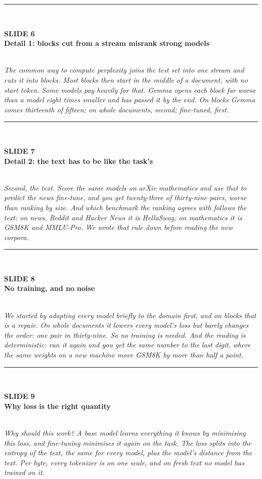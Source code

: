 \documentclass[11pt,a4paper]{article}
\newcommand{\slide}[3]{%
  \vspace{1.0em}%
  {\color{rule}\rule{\textwidth}{0.6pt}}\\[0.35em]%
  \begin{minipage}[t]{0.78\textwidth}%
    {\color{accent}\footnotesize\bfseries SLIDE #1}\\[0.15em]%
    {\large\bfseries #2}%
  \end{minipage}\hfill%
  \begin{minipage}[t]{0.20\textwidth}%
    \raggedleft{\footnotesize\color{mute}#3}%
  \end{minipage}\\[0.5em]%
}
\newenvironment{say}{\itshape}{\par}
\begin{document}
\slide{6}{Detail 1: blocks cut from a stream misrank strong models}{3:25--4:15}
\begin{say}
The common way to compute perplexity joins the test set into one stream and cuts it into blocks.
Most blocks then start in the middle of a document, with no start token. Some models pay heavily
for that. Gemma opens each block far worse than a model eight times smaller and has passed it by
the end. On blocks Gemma comes thirteenth of fifteen; on whole documents, second; fine-tuned,
first.
\end{say}

\slide{7}{Detail 2: the text has to be like the task's}{4:15--5:05}
\begin{say}
Second, the text. Score the same models on arXiv mathematics and use that to predict the news
fine-tune, and you get twenty-three of thirty-nine pairs, worse than ranking by size. And which
benchmark the ranking agrees with follows the text: on news, Reddit and Hacker News it is
HellaSwag; on mathematics it is GSM8K and MMLU-Pro. We wrote that rule down before reading the new
corpora.
\end{say}

\slide{8}{No training, and no noise}{5:05--5:50}
\begin{say}
We started by adapting every model briefly to the domain first, and on blocks that is a repair. On
whole documents it lowers every model's loss but barely changes the order: one pair in thirty-nine.
So no training is needed. And the reading is deterministic: run it again and you get the same
number to the last digit, where the same weights on a new machine move GSM8K by more than half a
point.
\end{say}

\slide{9}{Why loss is the right quantity}{5:50--6:30}
\begin{say}
Why should this work? A base model learns everything it knows by minimising this loss, and
fine-tuning minimises it again on the task. The loss splits into the entropy of the text, the same
for every model, plus the model's distance from the text. Per byte, every tokenizer is on one
scale, and on fresh text no model has trained on it.
\end{say}
\end{document}
